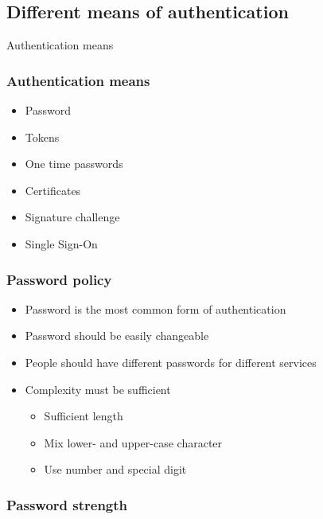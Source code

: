 \subsection{Different means of authentication}
\begin{frametransition}{Authentication means}
\end{frametransition}

\begin{frame}
\frametitle{Authentication means}
\begin{itemize}
\Large
\item Password
\pause
\item Tokens
\pause
\item One time passwords
\pause
\item Certificates
\pause
\item Signature challenge
\pause
\item Single Sign-On
\end{itemize}
\end{frame}

\begin{frame}
\frametitle{Password policy}
\begin{itemize}
\large
\item Password is the most common form of authentication
\pause
\item Password should be easily changeable
\pause
\item People should have different passwords for different services
\pause
\item Complexity must be sufficient
\pause
\begin{itemize}
\normalsize
\item Sufficient length
\pause
\item Mix lower- and upper-case character
\pause
\item Use number and special digit
\end{itemize}
\end{itemize}
\end{frame}

\begin{frame}
\frametitle{Password strength}
\end{frame}

